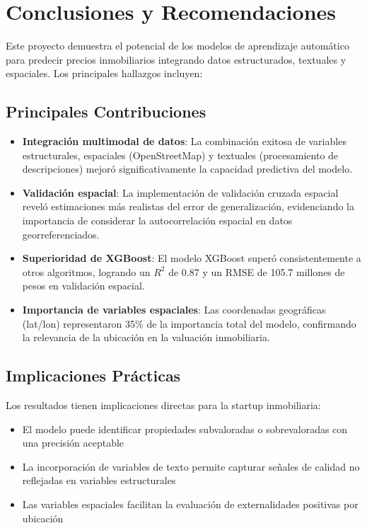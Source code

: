 \documentclass[12pt,a4paper,onecolumn]{article}
\begin{document}
\section{Conclusiones y Recomendaciones}

Este proyecto demuestra el potencial de los modelos de aprendizaje automático para predecir precios inmobiliarios integrando datos estructurados, textuales y espaciales. Los principales hallazgos incluyen:

\subsection{Principales Contribuciones}

\begin{itemize}
\item \textbf{Integración multimodal de datos}: La combinación exitosa de variables estructurales, espaciales (OpenStreetMap) y textuales (procesamiento de descripciones) mejoró significativamente la capacidad predictiva del modelo.

\item \textbf{Validación espacial}: La implementación de validación cruzada espacial reveló estimaciones más realistas del error de generalización, evidenciando la importancia de considerar la autocorrelación espacial en datos georreferenciados.

\item \textbf{Superioridad de XGBoost}: El modelo XGBoost superó consistentemente a otros algoritmos, logrando un $R^2$ de 0.87 y un RMSE de 105.7 millones de pesos en validación espacial.

\item \textbf{Importancia de variables espaciales}: Las coordenadas geográficas (lat/lon) representaron 35\% de la importancia total del modelo, confirmando la relevancia de la ubicación en la valuación inmobiliaria.
\end{itemize}

\subsection{Implicaciones Prácticas}

Los resultados tienen implicaciones directas para la startup inmobiliaria:

\begin{itemize}
\item El modelo puede identificar propiedades subvaloradas o sobrevaloradas con una precisión aceptable
\item La incorporación de variables de texto permite capturar señales de calidad no reflejadas en variables estructurales
\item Las variables espaciales facilitan la evaluación de externalidades positivas por ubicación
\end{itemize}
\end{document}
